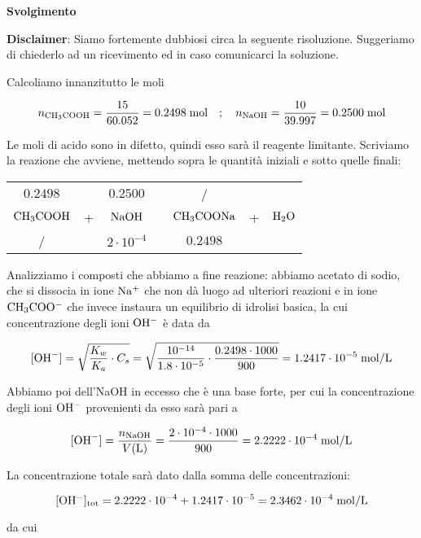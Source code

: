 \vspace{0.2cm}\large\textbf{Svolgimento}\normalsize

\vspace{0.2cm}\textbf{Disclaimer}: Siamo fortemente dubbiosi circa la seguente risoluzione. Suggeriamo di chiederlo ad un ricevimento ed in caso comunicarci la soluzione.

\vspace{0.2cm}Calcoliamo innanzitutto le moli

$$n_{\rm CH_3COOH}=\frac{15}{60.052}=0.2498 \; \text{mol}
\quad;\quad
n_{\rm NaOH}=\frac{10}{39.997}=0.2500 \; \text{mol}$$

Le moli di acido sono in difetto, quindi esso sarà il reagente limitante. Scriviamo la reazione che avviene, mettendo sopra le quantità iniziali e sotto quelle finali:

\begin{center}
    \begin{tabular}{ccccccc}
        $0.2498$ &  & $0.2500$ & & / &&\\
        $\rm CH_3COOH$ & + & $\rm NaOH$ & \ce{->} & $\rm CH_3COONa$ & + & $\rm H_2O$\\
        / &  & $2 \cdot 10^{-4}$ & & $0.2498$ &&\\
    \end{tabular}
\end{center}

Analizziamo i composti che abbiamo a fine reazione: abbiamo acetato di sodio, che si dissocia in ione $\rm Na^+$ che non dà luogo ad ulteriori reazioni e in ione $\rm CH_3COO^-$ che invece instaura un equilibrio di idrolisi basica, la cui concentrazione degli ioni $\rm OH^-$ è data da

$$[\text{OH}^-]
=\sqrt{\frac{K_w}{K_a}\cdot C_s}
=\sqrt{\frac{10^{-14}}{1.8 \cdot 10^{-5}} \cdot \frac{0.2498 \cdot 1000}{900}}
=1.2417 \cdot 10^{-5} \; \rm mol/L$$

Abbiamo poi dell'NaOH in eccesso che è una base forte, per cui la concentrazione degli ioni $\rm OH^-$ provenienti da esso sarà pari a

$$[\text{OH}^-]=\frac{n_{\rm NaOH}}{V(\text{L})}
=\frac{2 \cdot 10^{-4} \cdot 1000}{900}=2.2222 \cdot 10^{-4} \; \rm mol/L$$

La concentrazione totale sarà dato dalla somma delle concentrazioni:

$$\rm [OH^-]_{tot}=2.2222 \cdot 10^{-4} + 1.2417 \cdot 10^{-5}
=2.3462 \cdot 10^{-4} \; mol/L$$

da cui

